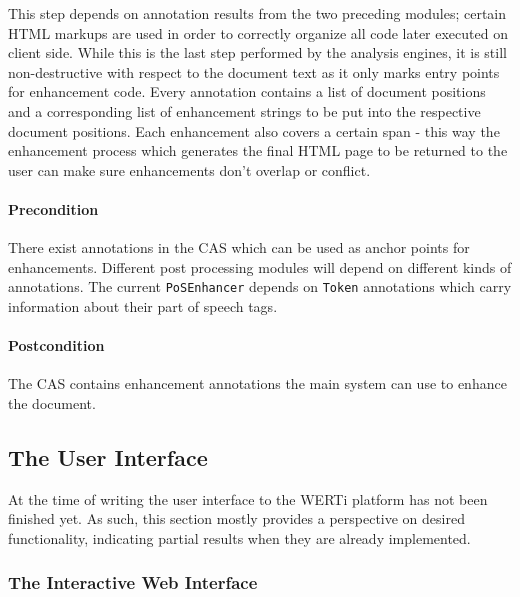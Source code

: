 \documentclass[12pt]{scrartcl}
\begin{document}
This step depends on
  annotation results from the two preceding modules; certain HTML markups are
  used in order to correctly organize all code later executed on client side.
  While this is the last step performed by the analysis engines, it is still
  non-destructive with respect to the document text as it only marks entry
  points for enhancement code. Every annotation contains a list of document
  positions and a corresponding list of enhancement strings to be put into the
  respective document positions. Each enhancement also covers a certain span -
  this way the enhancement process which generates the final HTML page to be
  returned to the user can make sure enhancements don't overlap or conflict.

  \paragraph{Precondition} There exist annotations in the CAS which can be used
  as anchor points for enhancements. Different post processing modules will
  depend on different kinds of annotations. The current \verb#PoSEnhancer#
  depends on \verb#Token# annotations which carry information about their
  part of speech tags.
  \paragraph{Postcondition} The CAS contains enhancement annotations the main
  system can use to enhance the document.

\subsection{The User Interface}

At the time of writing the user interface to the WERTi platform has not been
finished yet. As such, this section mostly provides a perspective on desired
functionality, indicating partial results when they are already implemented.

\subsubsection{The Interactive Web Interface}
\end{document}
